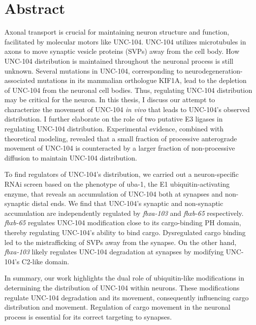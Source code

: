 \chapter*{Abstract}

Axonal transport is crucial for maintaining neuron structure and function, facilitated by molecular motors like UNC-104. UNC-104 utilizes microtubules in axons to move synaptic vesicle proteins (SVPs) away from the cell body. How UNC-104 distribution is maintained throughout the neuronal process is still unknown. Several mutations in UNC-104, corresponding to neurodegeneration-associated mutations in its mammalian orthologue KIF1A, lead to the depletion of UNC-104 from the neuronal cell bodies. Thus, regulating UNC-104 distribution may be critical for the neuron. In this thesis, I discuss our attempt to characterize the movement of UNC-104 \textit{in vivo} that leads to UNC-104’s observed distribution. I further elaborate on the role of two putative E3 ligases in regulating UNC-104 distribution. Experimental evidence, combined with theoretical modeling, revealed that a small fraction of processive anterograde movement of UNC-104 is counteracted by a larger fraction of non-processive diffusion to maintain UNC-104 distribution. 

To find regulators of UNC-104’s distribution, we carried out a neuron-specific RNAi screen based on the phenotype of uba-1, the E1 ubiquitin-activating enzyme, that reveals an accumulation of UNC-104 both at synapses and non-synaptic distal ends. We find that UNC-104’s synaptic and non-synaptic accumulation are independently regulated by \textit{fbxa-103} and \textit{fbxb-65} respectively. \textit{fbxb-65} regulates UNC-104 modification close to its cargo-binding PH domain, thereby regulating UNC-104’s ability to bind cargo. Dysregulated cargo binding led to the mistrafficking of SVPs away from the synapse. On the other hand, \textit{fbxa-103} likely regulates UNC-104 degradation at synapses by modifying UNC-104’s C2-like domain.

In summary, our work highlights the dual role of ubiquitin-like modifications in determining the distribution of UNC-104 within neurons. These modifications regulate UNC-104 degradation and its movement, consequently influencing cargo distribution and movement. Regulation of cargo movement in the neuronal process is essential for its correct targeting to synapses.


